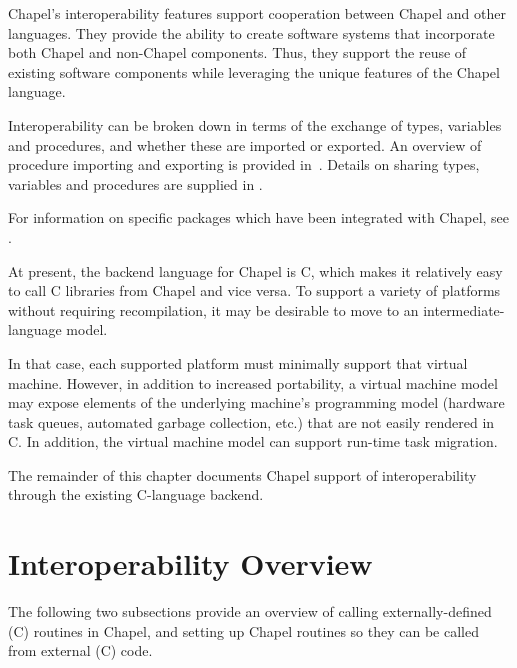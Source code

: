 \label{Interoperability}

Chapel's interoperability features support cooperation between Chapel
and other languages.  They provide the ability to create software
systems that incorporate both Chapel and non-Chapel components.
Thus, they support the reuse of existing software components while
leveraging the unique features of the Chapel language.

Interoperability can be broken down in terms of the exchange of types, variables
and procedures, and whether these are imported or exported.  An overview of
procedure importing and exporting is provided in~.
Details on sharing types, variables and procedures are supplied
in .

\begin{craychapel}
For information on specific packages which have been integrated with
Chapel, see .
\end{craychapel}

\begin{future}

At present, the backend language for Chapel is C, which makes it relatively
easy to call C libraries from Chapel and vice versa.  To support a variety of
platforms without requiring recompilation, it may be desirable to move
to an intermediate-language model.

In that case, each supported platform must minimally support that virtual
machine.  However, in addition to increased portability, a virtual machine
model may expose elements of the underlying machine's programming model
(hardware task queues, automated garbage collection, etc.) that are not easily
rendered in C.  In addition, the virtual machine model can support run-time task
migration.

\end{future}

The remainder of this chapter documents Chapel support of interoperability through
the existing C-language backend.

\section{Interoperability Overview}
\label{Interop_Overview}

The following two subsections provide an overview of calling externally-defined
(C) routines in Chapel, and setting up Chapel routines so they can be called
from external (C) code.

